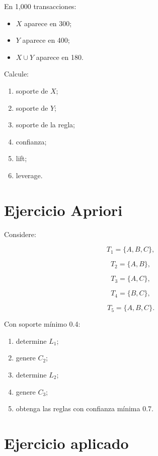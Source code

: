 \documentclass[
  spanish,
  10.5pt,
  letterpaper,
  DIV=11,
  numbers=noendperiod,
  oneside,
  open=any]{scrreprt}
\providecommand{\tightlist}{%
  \setlength{\itemsep}{0pt}\setlength{\parskip}{0pt}}
\theoremstyle{definition}
\theoremstyle{definition}
\theoremstyle{plain}
\theoremstyle{remark}
\begin{document}

En 1,000 transacciones:

\begin{itemize}
\tightlist
\item
  \(X\) aparece en 300;
\item
  \(Y\) aparece en 400;
\item
  \(X\cup Y\) aparece en 180.
\end{itemize}

Calcule:

\begin{enumerate}
\def\labelenumi{\arabic{enumi}.}
\tightlist
\item
  soporte de \(X\);
\item
  soporte de \(Y\);
\item
  soporte de la regla;
\item
  confianza;
\item
  lift;
\item
  leverage.
\end{enumerate}

\section*{Ejercicio Apriori}\label{ejercicio-apriori}


Considere:

\[
T_1=\{A,B,C\},
\]

\[
T_2=\{A,B\},
\]

\[
T_3=\{A,C\},
\]

\[
T_4=\{B,C\},
\]

\[
T_5=\{A,B,C\}.
\]

Con soporte mínimo 0.4:

\begin{enumerate}
\def\labelenumi{\arabic{enumi}.}
\tightlist
\item
  determine \(L_1\);
\item
  genere \(C_2\);
\item
  determine \(L_2\);
\item
  genere \(C_3\);
\item
  obtenga las reglas con confianza mínima 0.7.
\end{enumerate}

\section*{Ejercicio aplicado}\label{ejercicio-aplicado-16}
\end{document}
